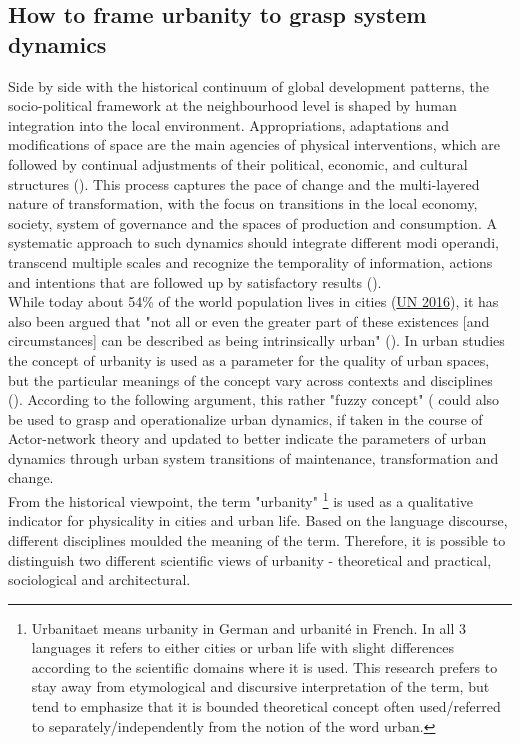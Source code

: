 \documentclass[11pt]{report}
\begin{document}
{{{\subsection{How to frame urbanity to grasp system dynamics}

Side by side with the historical continuum of global development patterns, the socio-political framework at the neighbourhood level is shaped by human integration into the local environment.
Appropriations, adaptations and modifications of space are the main agencies of physical interventions, which are followed by continual adjustments of their political, economic, and cultural structures (\href{Sykola}{\citealt{sykora_transitional_1999}}).
This process captures the pace of change and the multi-layered nature of transformation, with the focus on transitions in the local economy, society, system of governance and the spaces of production and consumption. A systematic approach to such dynamics should integrate different modi operandi, transcend multiple scales and recognize the temporality of information, actions and intentions that are followed up by satisfactory results  (\href{Tardin}{\citealt{tardin_landscape_2014}}).
\\

While today about 54\% of the world population lives in cities (\href{UN}{UN 2016}), it has also been argued that "not all or even the greater part of these existences [and circumstances] can be described as being intrinsically urban"
(\href{Scott}{\citealt{scott_nature_2015}}).
In urban studies the concept of urbanity is used as a parameter for the quality of urban spaces, but the particular meanings of the concept vary across contexts and disciplines (\citealt{(Bisson 2016}).
According to the following argument, this rather "fuzzy concept" (\citealt{Bourdin 2010} could also be used to grasp and operationalize urban dynamics, if taken in the course of Actor-network theory and updated to better indicate the parameters of urban dynamics through urban system transitions of maintenance, transformation and change.
\\

From the historical viewpoint, the term "urbanity"
\footnote{Urbanitaet means urbanity in German and urbanité in French. In all 3 languages it refers to either cities or urban life with slight differences according to the scientific domains where it is used.
This research prefers to stay away from etymological and discursive interpretation of the term, but tend to emphasize that it is bounded theoretical concept often used/referred to separately/independently from the notion of the word urban.}
is used as a qualitative indicator for physicality in cities and urban life. 
Based on the language discourse, different disciplines moulded the meaning of the term.
Therefore, it is possible to distinguish two different scientific views of urbanity - theoretical and practical, sociological and architectural.
\\

}}}
\end{document}

